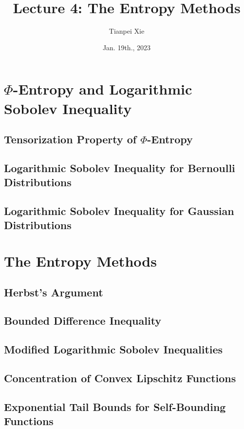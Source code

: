 \documentclass[11pt]{article}
\begin{document}
\title{Lecture 4: The Entropy Methods}
\author{ Tianpei Xie}
\date{Jan. 19th., 2023 }
\maketitle
\tableofcontents
\newpage
\section{$\Phi$-Entropy and Logarithmic Sobolev Inequality}
\subsection{Tensorization Property of $\Phi$-Entropy}
\subsection{Logarithmic Sobolev Inequality for Bernoulli Distributions}

\subsection{Logarithmic Sobolev Inequality for Gaussian Distributions}


\section{The Entropy Methods}
\subsection{Herbst's Argument}
\subsection{Bounded Difference Inequality}
\subsection{Modified Logarithmic Sobolev Inequalities}
\subsection{Concentration of Convex Lipschitz Functions}
\subsection{Exponential Tail Bounds for Self-Bounding Functions}


\newpage


\end{document}
